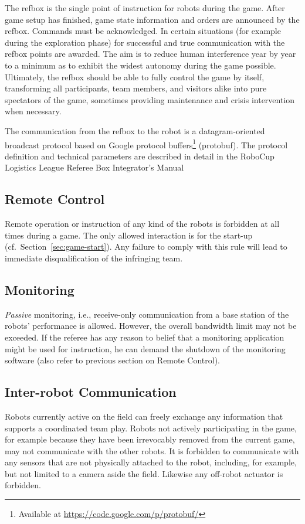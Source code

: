 \documentclass[12pt,twoside]{article}
\newcommand{\refsec}[1]{Section~\ref{#1}}
\begin{document}
The refbox is the single point of instruction for robots during the
game. After game setup has finished, game state information and orders
are announced by the refbox. Commands must be acknowledged. In certain
situations (for example during the exploration phase) for successful
and true communication with the refbox points are awarded. The aim is
to reduce human interference year by year to a minimum as to exhibit
the widest autonomy during the game possible. Ultimately, the refbox
should be able to fully control the game by itself, transforming all
participants, team members, and visitors alike into pure spectators of
the game, sometimes providing maintenance and crisis intervention when
necessary.

The communication from the refbox to the robot is a datagram-oriented
broadcast protocol based on Google protocol buffers\footnote{Available
  at \url{https://code.google.com/p/protobuf/}} (protobuf). The
protocol definition and technical parameters are described in detail
in the RoboCup Logistics League Referee Box Integrator's
Manual~\cite{RefBoxIntManual}

\subsection{Remote Control}
\label{sec:remote-control}
Remote operation or instruction of any kind of the robots is forbidden
at all times during a game. The only allowed interaction is for the
start-up (cf.~\refsec{sec:game-start}). Any failure to comply with
this rule will lead to immediate disqualification of the infringing
team.

\subsection{Monitoring}
\label{sec:monitoring}
\emph{Passive} monitoring, i.e., receive-only communication from a base
station of the robots' performance is allowed. However, the overall
bandwidth limit may not be exceeded.
If the referee has any reason to belief that a monitoring application
might be used for instruction, he can demand the shutdown of the
monitoring software (also refer to previous section on Remote
Control).

\subsection{Inter-robot Communication}
\label{sec:inter-robot-comm}
Robots currently active on the field can freely exchange any
information that supports a coordinated team play. Robots not actively
participating in the game, for example because they have been
irrevocably removed from the current game, may not communicate with
the other robots. It is forbidden to communicate with any sensors that
are not physically attached to the robot, including, for example, but
not limited to a camera aside the field. Likewise any off-robot
actuator is forbidden.
\end{document}
